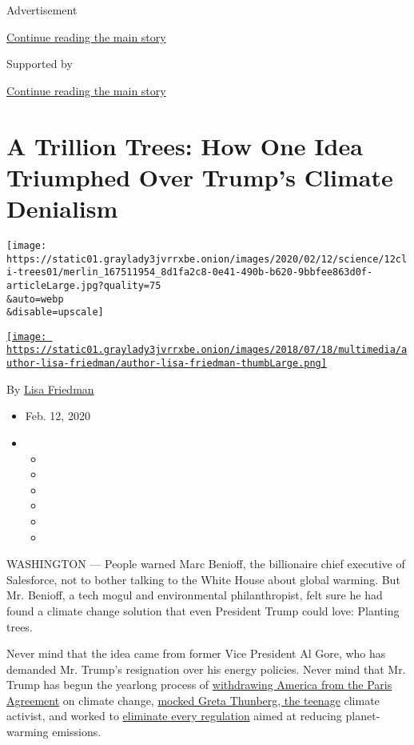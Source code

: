 Advertisement

\protect\hyperlink{after-top}{Continue reading the main story}

Supported by

\protect\hyperlink{after-sponsor}{Continue reading the main story}

\hypertarget{a-trillion-trees-how-one-idea-triumphed-over-trumps-climate-denialism}{%
\section{A Trillion Trees: How One Idea Triumphed Over Trump's Climate
Denialism}\label{a-trillion-trees-how-one-idea-triumphed-over-trumps-climate-denialism}}

\texttt{[image: https://static01.graylady3jvrrxbe.onion/images/2020/02/12/science/12cli-trees01/merlin\_167511954\_8d1fa2c8-0e41-490b-b620-9bbfee863d0f-articleLarge.jpg?quality=75\\\&auto=webp\\\&disable=upscale]}

\href{https://www.nytimes3xbfgragh.onion/by/lisa-friedman}{\texttt{[image: https://static01.graylady3jvrrxbe.onion/images/2018/07/18/multimedia/author-lisa-friedman/author-lisa-friedman-thumbLarge.png]}}

By \href{https://www.nytimes3xbfgragh.onion/by/lisa-friedman}{Lisa
Friedman}

\begin{itemize}
\item
  Feb. 12, 2020
\item
  \begin{itemize}
  \item
  \item
  \item
  \item
  \item
  \item
  \end{itemize}
\end{itemize}

WASHINGTON --- People warned Marc Benioff, the billionaire chief
executive of Salesforce, not to bother talking to the White House about
global warming. But Mr. Benioff, a tech mogul and environmental
philanthropist, felt sure he had found a climate change solution that
even President Trump could love: Planting trees.

Never mind that the idea came from former Vice President Al Gore, who
has demanded Mr. Trump's resignation over his energy policies. Never
mind that Mr. Trump has begun the yearlong process of
\href{https://www.nytimes3xbfgragh.onion/2019/11/04/climate/trump-paris-agreement-climate.html}{withdrawing
America from the Paris Agreement} on climate change,
\href{https://www.nytimes3xbfgragh.onion/2019/12/12/us/politics/greta-thunberg-trump.html}{mocked
Greta Thunberg, the teenage} climate activist, and worked to
\href{https://www.nytimes3xbfgragh.onion/interactive/2019/climate/trump-environment-rollbacks.html}{eliminate
every regulation} aimed at reducing planet-warming emissions.

